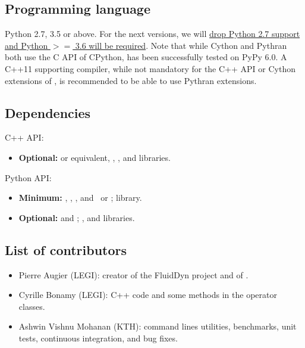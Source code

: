 \subsection{Programming language}


Python 2.7, 3.5 or above. For the next versions, we will
\href{https://python3statement.org/}{drop Python 2.7 support and Python $>=$
3.6 will be required}.
%
Note that while Cython and Pythran both use the C API of CPython, 
has been successfully tested on PyPy 6.0.
%
A C++11 supporting compiler, while not mandatory for the C++ API or Cython
extensions of , is recommended to be able to use Pythran extensions.

\subsection{Dependencies}

C++ API:
\begin{itemize}
  \item{\bf Optional:}  or equivalent, ,
    ,  and  libraries.
\end{itemize}

Python API:

\begin{itemize}
\item {\bf Minimum:} , , , and
  \ or ;  library.
\item {\bf Optional:}  and ; ,
   and  libraries.
\end{itemize}


\subsection{List of contributors}


\begin{itemize}
\item Pierre Augier (LEGI): creator of the FluidDyn project and of
.
\item Cyrille Bonamy (LEGI): C++ code and some methods in the operator classes.
\item Ashwin Vishnu Mohanan (KTH): command lines utilities, benchmarks, unit
  tests, continuous integration, and bug fixes.
\end{itemize}

